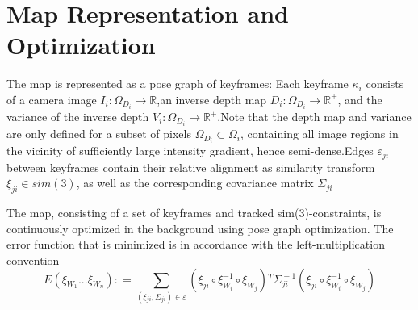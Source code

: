 \section{Map Representation and Optimization}
The map is represented as a pose graph of keyframes: Each keyframe $\kappa_{i}$ consists of a camera image $I_{i}\!:\!\Omega_{D_{i}}\!\rightarrow \!{\mathbb{R}}$,an inverse depth map $D_{i}\!:\!\Omega_{D_{i}}\!\rightarrow \!{\mathbb{R}}^{+}$, and the variance of the inverse depth $ V_{i}\!:\!\Omega_{D_{i}}\!\rightarrow \!{\mathbb{R}}^{+}$.Note that the depth map and variance are only defined for a subset of pixels $ \Omega_{D_{i}}\!\subset\!\Omega_{i} $, containing all image regions in the vicinity of sufficiently large intensity gradient, hence semi-dense.Edges $ \varepsilon_{ji}$ between keyframes contain their relative alignment as similarity transform $ \xi_{ji}\in sim(3) $, as well as the corresponding covariance matrix $\Sigma_{ji} $

The map, consisting of a set of keyframes and tracked sim(3)-constraints, is continuously optimized in the background using pose graph optimization. The
error function that is minimized is in accordance with the left-multiplication convention
\begin{equation}
E(\xi\!_{W\!_{1}}\!...\!\xi\!_{W\!_{n}})\!:\!= \sum\limits_{(\!\xi\!_{ji},\Sigma\!_{ji}\!)\!\in\!\varepsilon}\!(\!\xi_{ji}\!\circ\!\xi_{\!W_{i}\!}^{-1}\! \!\circ\!\xi_{\!W\!_{j}}\!)\!^{T}\!\Sigma_{\!j\!i}^{\!-1\!}\!(\!\xi_{ji}\!\circ\!\xi_{\!W_{i}\!}^{-1}\! \!\circ\!\xi_{\!W\!_{j}}\!)
\end{equation}


